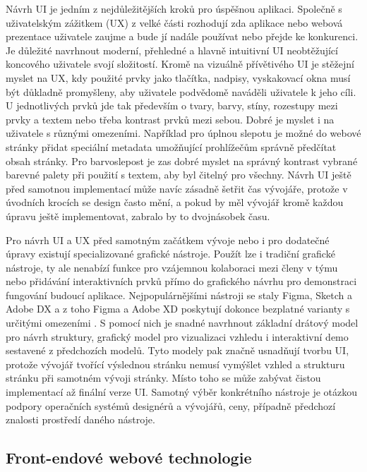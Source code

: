 \begin{itemize}
\begin{itemize}
	Návrh \ac{UI} je jedním z nejdůležitějších kroků pro úspěšnou aplikaci.
	Společně s uživatelským zážitkem (\noindent\ac{UX}) z velké části rozhodují zda aplikace nebo webová prezentace
	uživatele zaujme a bude jí nadále používat nebo přejde ke konkurenci.
	Je důležité navrhnout moderní, přehledné a hlavně intuitivní \ac{UI} neobtěžující koncového uživatele svojí složitostí.
	Kromě na vizuálně přívětivého \ac{UI} je stěžejní myslet na \ac{UX}, kdy použité prvky jako tlačítka, nadpisy,
	vyskakovací okna musí být důkladně promyšleny, aby uživatele podvědomě naváděli uživatele k jeho cíli.
	U jednotlivých prvků jde tak především o tvary, barvy, stíny, rozestupy mezi prvky a textem nebo třeba kontrast prvků
	mezi sebou.
	Dobré je myslet i na uživatele s různými omezeními.
	Například pro úplnou slepotu je možné do webové stránky přidat speciální metadata umožňující prohlížečům správně
	předčítat obsah stránky.
	Pro barvoslepost je zas dobré myslet na správný kontrast vybrané barevné palety při použití s textem, aby byl
	čitelný pro všechny.
	Návrh \ac{UI} ještě před samotnou implementací může navíc zásadně šetřit čas vývojáře, protože v úvodních krocích
	se design často mění, a pokud by měl vývojář kromě každou úpravu ještě implementovat, zabralo by to dvojnásobek času.

	Pro návrh \ac{UI} a \ac{UX} před samotným začátkem vývoje nebo i pro dodatečné úpravy existují specializované
	grafické nástroje.
	Použít lze i tradiční grafické nástroje, ty ale nenabízí funkce pro vzájemnou kolaboraci mezi
	členy v týmu nebo přidávání interaktivních prvků přímo do grafického návrhu pro demonstraci fungování budoucí
	aplikace.
	Nejpopulárnějšími nástroji se staly Figma, Sketch a Adobe DX a z toho Figma a Adobe XD poskytují dokonce bezplatné
	varianty s určitými omezeními \cite{design_tools_database}.
	S pomocí nich je snadné navrhnout základní drátový model pro návrh struktury, grafický model pro vizualizaci
	vzhledu i interaktivní demo sestavené z předchozích modelů.
	Tyto modely pak značně usnadňují tvorbu \ac{UI}, protože vývojář tvořící výslednou stránku nemusí vymýšlet
	vzhled a strukturu stránku při samotném vývoji stránky.
	Místo toho se může zabývat čistou implementací až finální verze \ac{UI}.
	Samotný výběr konkrétního nástroje je otázkou podpory operačních systémů designérů a vývojářů, ceny, případně
	předchozí znalosti prostředí daného nástroje.

	\subsection{Front-endové webové technologie}


\end{itemize}
\end{itemize}
